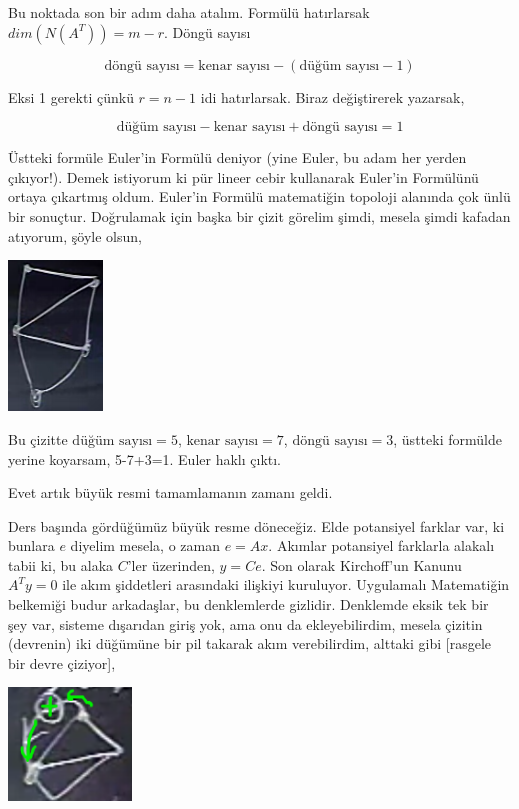 \documentclass[12pt,fleqn]{article}\usepackage{../../common}
\begin{document}
Bu noktada son bir adım daha atalım. Formülü hatırlarsak
$dim(N(A^T))=m-r$. Döngü sayısı

$$ \textrm{döngü sayısı} = \textrm{kenar sayısı} - (\textrm{düğüm sayısı} - 1) $$

Eksi 1 gerekti çünkü $r=n-1$ idi hatırlarsak. Biraz değiştirerek yazarsak, 

$$ \textrm{düğüm sayısı} - \textrm{kenar sayısı}  + \textrm{döngü sayısı} = 1 $$

Üstteki formüle Euler'in Formülü deniyor (yine Euler, bu adam her yerden
çıkıyor!). Demek istiyorum ki pür lineer cebir kullanarak Euler'in
Formülünü ortaya çıkartmış oldum. Euler'in Formülü matematiğin topoloji
alanında çok ünlü bir sonuçtur. Doğrulamak için başka bir çizit görelim
şimdi, mesela şimdi kafadan atıyorum, şöyle olsun,

\includegraphics[height=4cm]{12_7.png}

Bu çizitte $\textrm{düğüm sayısı}=5$, $\textrm{kenar sayısı}=7$,
$\textrm{döngü sayısı}=3$, üstteki formülde yerine koyarsam, 5-7+3=1. Euler
haklı çıktı.

Evet artık büyük resmi tamamlamanın zamanı geldi.

Ders başında gördüğümüz büyük resme döneceğiz. Elde potansiyel farklar var,
ki bunlara $e$ diyelim mesela, o zaman $e=Ax$.  Akımlar potansiyel
farklarla alakalı tabii ki, bu alaka $C$'ler üzerinden, $y=Ce$. Son olarak
Kirchoff'un Kanunu $A^Ty=0$ ile akım şiddetleri arasındaki ilişkiyi
kuruluyor. Uygulamalı Matematiğin belkemiği budur arkadaşlar, bu
denklemlerde gizlidir. Denklemde eksik tek bir şey var, sisteme dışarıdan
giriş yok, ama onu da ekleyebilirdim, mesela çizitin (devrenin) iki
düğümüne bir pil takarak akım verebilirdim, alttaki gibi [rasgele bir devre
çiziyor],

\includegraphics[height=3cm]{12_8.png}
\end{document}

